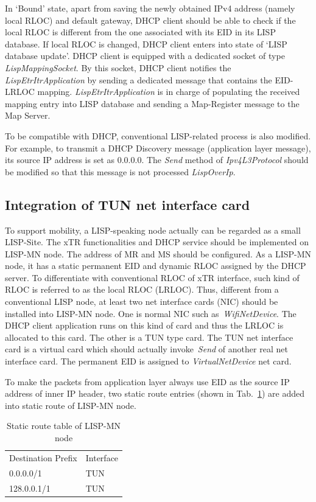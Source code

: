 In `Bound' state, apart from saving the newly obtained IPv4 address (namely local RLOC) and default gateway, DHCP client should be able to check if the local RLOC is different from the one associated with its EID in its LISP database.
If local RLOC is changed, DHCP client enters into state of `LISP database update'. DHCP client is equipped with a dedicated socket of type \emph{LispMappingSocket}. By this socket, DHCP client notifies the \emph{LispEtrItrApplication} by sending a dedicated message that contains the EID-LRLOC mapping. \emph{LispEtrItrApplication} is in charge of populating the received mapping entry into LISP database and sending a Map-Register message to the Map Server.

To be compatible with DHCP, conventional LISP-related process is also modified. For example, to transmit a DHCP Discovery message (application layer message), its source IP address is set as $0.0.0.0$. The \emph{Send} method of \emph{Ipv4L3Protocol} should be modified so that this message is not processed \emph{LispOverIp}.

\subsection{Integration of TUN net interface card}
\label{subsec:tundevice}
To support mobility, a LISP-speaking node actually can be regarded as a small LISP-Site. The xTR functionalities and DHCP service should be implemented on LISP-MN node. The address of MR and MS should be configured. As a LISP-MN node, it has a static permanent EID and dynamic RLOC assigned by the DHCP server. To differentiate with conventional RLOC of xTR interface, such kind of RLOC is referred to as the local RLOC (LRLOC). Thus, different from a conventional LISP node, at least two net interface cards (NIC) should be installed into LISP-MN node. One is normal NIC such as~\emph{WifiNetDevice}. The DHCP client application runs on this kind of card and thus the LRLOC is allocated to this card. The other is a TUN type card. The TUN net interface card is a virtual card which should actually invoke~\emph{Send} of another real net interface card. The permanent EID is assigned to \emph{VirtualNetDevice} net card. 

To make the packets from application layer always use EID as the source IP address of inner IP header, two static route entries (shown in Tab.~\ref{tab:static-route-table}) are added into static route of LISP-MN node.
\begin{table}[]
	\centering
	\caption{Static route table of LISP-MN node}
	\label{tab:static-route-table}
	\begin{tabular}{ll}
		Destination Prefix & Interface \\
		0.0.0.0/1          & TUN       \\
		128.0.0.1/1        & TUN      
	\end{tabular}
\end{table}

